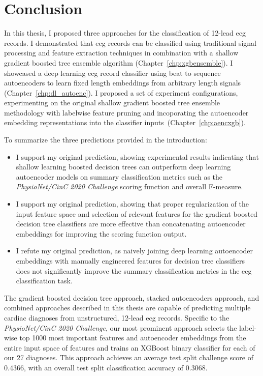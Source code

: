 \documentclass[\main/thesis.tex]{subfiles}
\begin{document}
\chapter{Conclusion}
\label{chp:conclusion}

In this thesis, I proposed three approaches for the classification of 12-lead \gls{ecg} records.
I demonstrated that \gls{ecg} records can be classified using traditional signal processing and feature extraction techniques in combination with a shallow gradient boosted tree ensemble algorithm (Chapter~\ref{chp:xgbensemble}).
I showcased a deep learning \gls{ecg} record classifier using beat to sequence autoencoders to learn fixed length embeddings from arbitrary length signals (Chapter~\ref{chp:dl_autoenc}).
I proposed a set of experiment configurations, experimenting on the original shallow gradient boosted tree ensemble methodology with labelwise feature pruning and incoporating the autoencoder embedding representations into the classifier inputs~(Chapter~\ref{chp:aencxgb}).

To summarize the three predictions provided in the introduction:
\begin{itemize}
    \item I support my original prediction, showing experimental results indicating that shallow learning boosted decision trees can outperform deep learning autoencoder models on summary classification metrics such as the \emph{PhysioNet/CinC 2020 Challenge} scoring function and overall F-measure.
    \item I support my original prediction, showing that proper regularization of the input feature space and selection of relevant features for the gradient boosted decision tree classifiers are more effective than concatenating autoencoder embeddings for improving the scoring function output.
    \item I refute my original prediction, as naively joining deep learning autoencoder embeddings with manually engineered features for decision tree classifiers does not significantly improve the summary classification metrics in the \gls{ecg} classification task.
\end{itemize}

The gradient boosted decision tree approach, stacked autoencoders approach, and combined approaches described in this thesis are capable of predicting multiple cardiac diagnoses from unstructured, 12-lead \gls{ecg} records.
Specific to the \emph{PhysioNet/CinC 2020 Challenge}, our most prominent approach selects the label-wise top 1000 most important features and autoencoder embeddings from the entire input space of features and trains an XGBoost binary classifier for each of our 27 diagnoses.
This approach achieves an average test split challenge score of $0.4366$, with an overall test split classification accuracy of $0.3068$.
\end{document}
